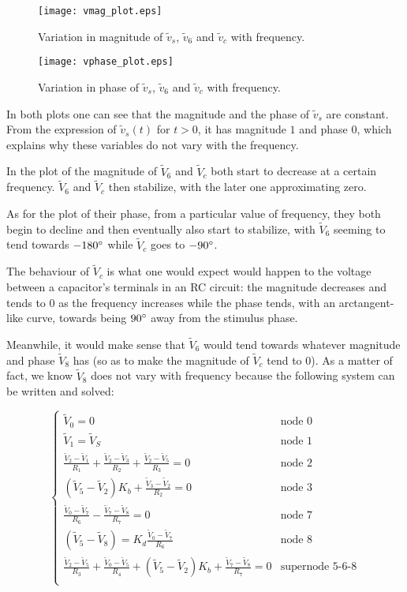\begin{figure}[H] \centering
\texttt{[image: vmag\_plot.eps]}
\caption{Variation in magnitude of $\tilde{v}_s$, $\tilde{v}_6$ and $\tilde{v}_c$ with frequency.}
\label{fig:magnitude}
\end{figure}


\begin{figure}[H] \centering
\texttt{[image: vphase\_plot.eps]}
\caption{Variation in phase of $\tilde{v}_s$, $\tilde{v}_6$ and $\tilde{v}_c$ with frequency.}
\label{fig:phase}
\end{figure}

In both plots one can see that the magnitude and the phase of $\tilde{v}_s$ are constant. From the expression of $\tilde{v}_s(t)$ for $t>0$, it has magnitude $1$ and phase $0$, which explains why these variables do not vary with the frequency.
\par
In the plot of the magnitude of $\tilde{V}_6$ and $\tilde{V}_c$ both start to decrease at a certain frequency. $\tilde{V}_6$ and $\tilde{V}_c$ then stabilize, with the later one approximating zero.
\par
As for the plot of their phase, from a particular value of frequency, they both begin to decline and then eventually also start to stabilize, with $\tilde{V}_6$ seeming to tend towards $-180\degree$ while $\tilde{V}_c$ goes to $-90\degree$.

The behaviour of $\tilde{V}_c$ is what one would expect would happen to the voltage between a capacitor's terminals in an RC circuit: the magnitude decreases and tends to 0 as the frequency increases while the phase tends, with an arctangent-like curve, towards being $90\degree$ away from the stimulus phase.

Meanwhile, it would make sense that $\tilde{V}_6$ would tend towards whatever magnitude and phase $\tilde{V}_8$ has (so as to make the magnitude of $\tilde{V}_c$ tend to $0$). As a matter of fact, we know $\tilde{V}_8$ does not vary with frequency because the following system can be written and solved:


\begin{equation}
  \begin{cases}
  \tilde{V}_0 = 0 & \mbox{node 0} \\
   \tilde{V}_1 = \tilde{V}_S & \mbox{node 1} \\
  \frac{\tilde{V}_2-\tilde{V}_1}{R_1}+\frac{\tilde{V}_2-\tilde{V}_3}{R_2}+\frac{\tilde{V}_2-\tilde{V}_5}{R_3} = 0 & \mbox{node 2} \\
  (\tilde{V}_5-\tilde{V}_2)K_b + \frac{\tilde{V}_3-\tilde{V}_2}{R_2} = 0 & \mbox{node 3} \\
  \frac{\tilde{V}_0-\tilde{V}_7}{R_6} - \frac{\tilde{V}_7-\tilde{V}_8}{R_7} = 0 & \mbox{node 7} \\
  (\tilde{V}_5-\tilde{V}_8) = K_d \frac{\tilde{V}_0-\tilde{V}_7}{R_6} & \mbox{node 8} \\
  \frac{\tilde{V}_2-\tilde{V}_5}{R_3} + \frac{\tilde{V}_0-\tilde{V}_5}{R_4} + (\tilde{V}_5-\tilde{V}_2)K_b + \frac{\tilde{V}_7-\tilde{V}_8}{R_7}  = 0 & \mbox{supernode 5-6-8} \\ 
  \end{cases}
\end{equation}

